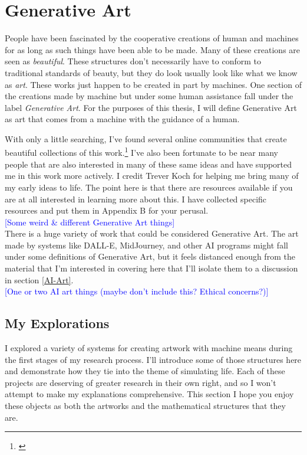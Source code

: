 \documentclass[12pt,twoside]{reedthesis}
\begin{document}
\section{Generative Art}
\label{GenerativeArt}

	People have been fascinated by the cooperative creations of human and machines for as long as such things have been able to be made. Many of these creations are seen as \textit{beautiful}. These structures don't necessarily have to conform to traditional standards of beauty, but they do look usually look like what we know as \textit{art}. These works just happen to be created in part by machines. One section of the creations made by machine but under some human assistance fall under the label \textit{Generative Art}. For the purposes of this thesis, I will define Generative Art as art that comes from a machine with the guidance of a human.
	
	With only a little searching, I've found several online communities that create beautiful collections of this work.\footnote{\cite{reddit2023}} I've also been fortunate to be near many people that are also interested in many of these same ideas and have supported me in this work more actively. I credit Trever Koch for helping me bring many of my early ideas to life. The point here is that there are resources available if you are at all interested in learning more about this. I have collected specific resources and put them in Appendix B for your perusal.\\
	
	\textcolor{blue}{[Some weird \& different Generative Art things]}\\
	
	There is a huge variety of work that could be considered Generative Art. The art made by systems like DALL-E, MidJourney, and other AI programs might fall under some definitions of Generative Art, but it feels distanced enough from the material that I'm interested in covering here that I'll isolate them to a discussion in section \ref{AI-Art}.\\
	
	\textcolor{blue}{[One or two AI art things (maybe don't include this? Ethical concerns?)]}
	
\subsection{My Explorations} %
	
	I explored a variety of systems for creating artwork with machine means during the first stages of my research process. I'll introduce some of those structures here and demonstrate how they tie into the theme of simulating life. Each of these projects are deserving of greater research in their own right, and so I won't attempt to make my explanations comprehensive. This section I hope you enjoy these objects as both the artworks and the mathematical structures that they are.\\
\end{document}
